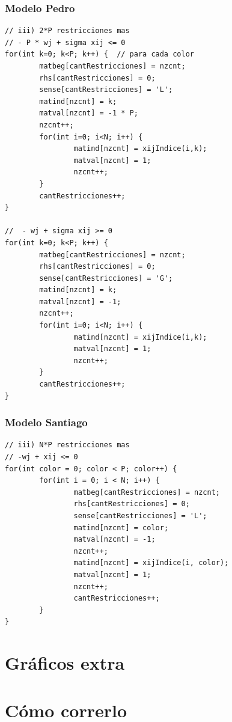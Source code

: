 \documentclass[a4paper, 10pt, twoside]{article}
\begin{document}
\subsubsection{Modelo Pedro}
\label{codigo-modelo-pedro}

\begin{lstlisting}
// iii) 2*P restricciones mas
// - P * wj + sigma xij <= 0
for(int k=0; k<P; k++) {  // para cada color
		matbeg[cantRestricciones] = nzcnt;
		rhs[cantRestricciones] = 0;
		sense[cantRestricciones] = 'L';
		matind[nzcnt] = k;
		matval[nzcnt] = -1 * P;
		nzcnt++;
		for(int i=0; i<N; i++) {
				matind[nzcnt] = xijIndice(i,k);
				matval[nzcnt] = 1;
				nzcnt++;
		}
		cantRestricciones++;
}

//  - wj + sigma xij >= 0
for(int k=0; k<P; k++) {
		matbeg[cantRestricciones] = nzcnt;
		rhs[cantRestricciones] = 0;
		sense[cantRestricciones] = 'G';
		matind[nzcnt] = k;
		matval[nzcnt] = -1;
		nzcnt++;
		for(int i=0; i<N; i++) {
				matind[nzcnt] = xijIndice(i,k);
				matval[nzcnt] = 1;
				nzcnt++;
		}
		cantRestricciones++;
}
\end{lstlisting}

\subsubsection{Modelo Santiago}
\label{codigo-modelo-santiago}

\begin{lstlisting}
// iii) N*P restricciones mas
// -wj + xij <= 0
for(int color = 0; color < P; color++) { 
		for(int i = 0; i < N; i++) {
				matbeg[cantRestricciones] = nzcnt;
				rhs[cantRestricciones] = 0;
				sense[cantRestricciones] = 'L';
				matind[nzcnt] = color;
				matval[nzcnt] = -1;
				nzcnt++;
				matind[nzcnt] = xijIndice(i, color);
				matval[nzcnt] = 1;
				nzcnt++;
				cantRestricciones++;
		}
}
\end{lstlisting}


\newpage

\section{Gráficos extra}
\label{apendice-graficos}


\newpage

\section{Cómo correrlo}
\label{como-correrlo}
\end{document}

